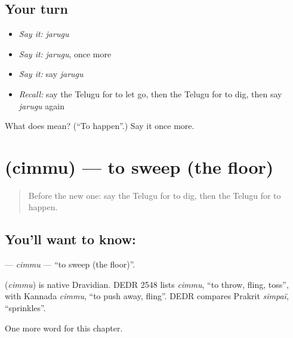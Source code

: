 \subsection*{Your turn}
\begin{itemize}
\raggedright
  \item \emph{Say it:} \emph{jarugu}
  \item \emph{Say it:} \emph{jarugu}, once more
  \item \emph{Say it:} say \emph{jarugu}
  \item \emph{Recall:} say the Telugu for to let go, then the Telugu for to dig, then say \emph{jarugu} again
\end{itemize}

\begin{tcolorbox}[breakable,colback=teal!4,colframe=teal!35!black,title={Before you move on}]
What does  mean? (\textquotedblleft{}To happen\textquotedblright{}.) Say it once more.
\end{tcolorbox}
\section[\texorpdfstring{\te{చిమ్ము} (cimmu)}{చిమ్ము (cimmu)}]{ (cimmu) — to sweep (the floor)}

\label{lesson:TE-C284-cimmu}



\begin{quote}
Before the new one: say the Telugu for to dig, then the Telugu for to happen.
\end{quote}

\subsection*{You'll want to know: }
\textbf{} — \emph{cimmu} — \textquotedblleft{}to sweep (the floor)\textquotedblright{}.

\begin{cousinweb}
\textbf{} (\emph{cimmu}) is native Dravidian. DEDR 2548 lists \emph{cimmu}, \textquotedblleft{}to throw, fling, toss\textquotedblright{}, with Kannada \emph{cimmu}, \textquotedblleft{}to push away, fling\textquotedblright{}. DEDR compares Prakrit \emph{simpaï}, \textquotedblleft{}sprinkles\textquotedblright{}.
\end{cousinweb}

\begin{grammarlens}[title={What you've built}]
One more word for this chapter.
\end{grammarlens}

